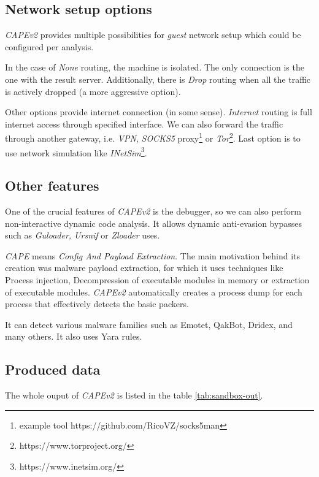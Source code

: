 \subsection{Network setup options}
\emph{CAPEv2} provides multiple possibilities for \emph{guest} network setup which could be configured per analysis. 

In the case of \emph{None} routing, the machine is isolated. The only connection is the one with the result server. Additionally, there is \emph{Drop} routing when all the traffic is actively dropped (a more aggressive option). 

Other options provide internet connection (in some sense). \emph{Internet} routing is full internet access through specified interface. We can also forward the traffic through another gateway, i.e. \emph{VPN}, \emph{SOCKS5} proxy\footnote{example tool https://github.com/RicoVZ/socks5man} or \emph{Tor}\footnote{https://www.torproject.org/}. Last option is to use network simulation like \emph{INetSim}\footnote{https://www.inetsim.org/}.

\subsection{Other features}
One of the crucial features of \emph{CAPEv2} is the debugger, so we can also perform non-interactive dynamic code analysis. It allows dynamic anti-evasion bypasses such as \emph{Guloader, Ursnif} or \emph{Zloader} uses.

\emph{CAPE} means \emph{Config And Payload Extraction}. The main motivation behind its creation was malware payload extraction, for which it uses techniques like Process injection, Decompression of executable modules in memory or extraction of executable modules. \emph{CAPEv2} automatically creates a process dump for each process that effectively detects the basic packers.

It can detect various malware families such as Emotet, QakBot, Dridex, and many others. It also uses Yara rules.

\subsection{Produced data}
The whole ouput of \emph{CAPEv2} is listed in the table \ref{tab:sandbox-out}.

